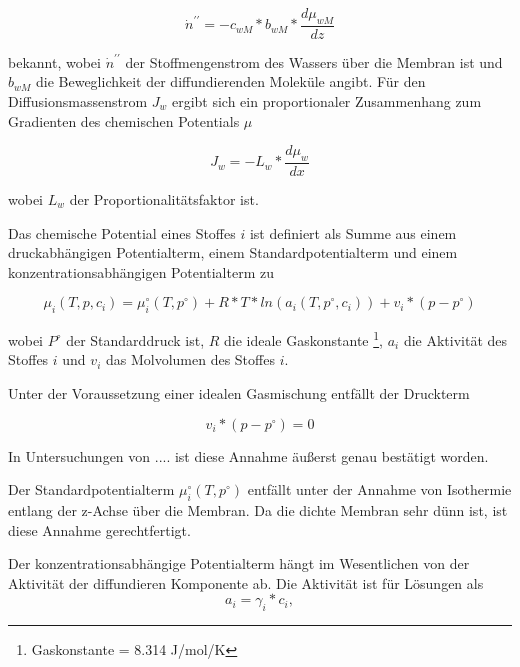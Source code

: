 \begin{normalsize}
\begin{LARGE}
\begin{equation}
 \dot{n}^{\prime\prime} = - c_{wM} * b_{wM} * \frac{d\mu_{wM}}{dz}
\end{equation}

bekannt, wobei $\dot{n}^{\prime\prime}$ der Stoffmengenstrom des Wassers über die Membran ist und $b_{wM}$ die Beweglichkeit der diffundierenden Moleküle angibt. \cite{T.Melin.2007}
Für den Diffusionsmassenstrom $J_{w}$ ergibt sich ein proportionaler Zusammenhang zum Gradienten des chemischen Potentials $\mu$

\begin{equation}
J_{w} = -L_{w}*\frac{d\mu_{w}}{dx}
\end{equation}

wobei $L_{w}$ der Proportionalitätsfaktor ist.

Das chemische Potential eines Stoffes $i$ ist definiert als Summe aus einem druckabhängigen Potentialterm, einem Standardpotentialterm und einem konzentrationsabhängigen Potentialterm zu

\begin{equation}
\mu_{i}(T,p,c_{i}) = \mu_{i}^\circ (T,p^\circ) + R*T*ln(a_{i}(T,p^\circ,c_{i})) + v_{i}*(p-p^\circ)
\end{equation}


wobei $P^\circ$ der Standarddruck ist, $R$ die ideale Gaskonstante \footnote{Gaskonstante = 8.314 J/mol/K}, $a_{i}$ die Aktivität des Stoffes $i$ und $v_{i}$ das Molvolumen des Stoffes $i$.


Unter der Voraussetzung einer idealen Gasmischung entfällt der Druckterm

\begin{equation}
v_{i}*(p-p^\circ)= 0
\end{equation}

In Untersuchungen von .... ist diese Annahme äußerst genau bestätigt worden.

Der Standardpotentialterm $\mu_{i}^\circ(T,p^\circ)$ entfällt unter der Annahme von Isothermie entlang der z-Achse über die Membran. Da die dichte Membran sehr dünn ist, ist diese Annahme gerechtfertigt.

Der konzentrationsabhängige Potentialterm hängt im Wesentlichen von der Aktivität der diffundieren Komponente ab. Die Aktivität ist für Lösungen als
\begin{equation}
a_{i} = \gamma_{i}  * c_{i},
\end{equation}


\end{LARGE}
\end{normalsize}
